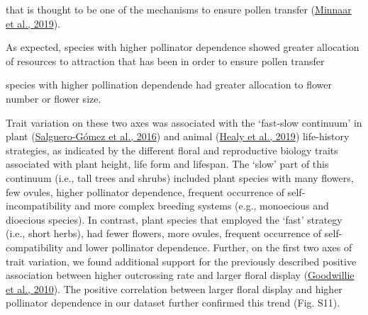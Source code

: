 \documentclass[
  12pt,
  a4paper,
]{article}
\begin{document}
that is thought to be one of the mechanisms to ensure pollen transfer (\protect\hyperlink{ref-minnaar2019}{Minnaar et al., 2019}).

As expected, species with higher pollinator dependence showed greater allocation of resources to attraction that has been in order to ensure pollen transfer

species with higher pollination dependende had greater allocation to flower number or flower size.

Trait variation on these two axes was associated with the `fast-slow continuum' in plant (\protect\hyperlink{ref-salguero2016}{Salguero-Gómez et al., 2016}) and animal (\protect\hyperlink{ref-healy2019}{Healy et al., 2019}) life-history strategies, as indicated by the different floral and reproductive biology traits associated with plant height, life form and lifespan. The `slow' part of this continuum (i.e., tall trees and shrubs) included plant species with many flowers, few ovules, higher pollinator dependence, frequent occurrence of self-incompatibility and more complex breeding systems (e.g., monoecious and dioecious species). In contrast, plant species that employed the `fast' strategy (i.e., short herbs), had fewer flowers, more ovules, frequent occurrence of self-compatibility and lower pollinator dependence. Further, on the first two axes of trait variation, we found additional support for the previously described positive association between higher outcrossing rate and larger floral display (\protect\hyperlink{ref-goodwillie2010}{Goodwillie et al., 2010}). The positive correlation between larger floral display and higher pollinator dependence in our dataset further confirmed this trend (Fig. S11).
\end{document}
